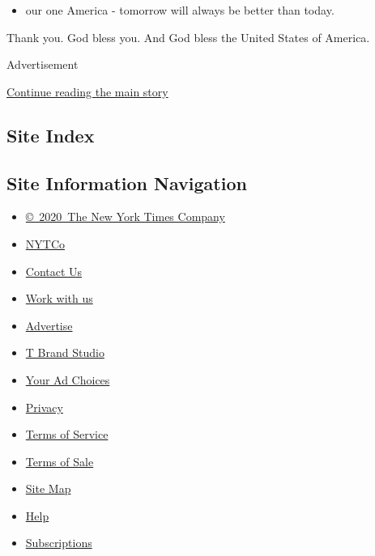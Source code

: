 \begin{itemize}
\tightlist
\item
  our one America - tomorrow will always be better than today.
\end{itemize}

Thank you. God bless you. And God bless the United States of America.

Advertisement

\protect\hyperlink{after-bottom}{Continue reading the main story}

\hypertarget{site-index}{%
\subsection{Site Index}\label{site-index}}

\hypertarget{site-information-navigation}{%
\subsection{Site Information
Navigation}\label{site-information-navigation}}

\begin{itemize}
\tightlist
\item
  \href{https://help.nytimes3xbfgragh.onion/hc/en-us/articles/115014792127-Copyright-notice}{©~2020~The
  New York Times Company}
\end{itemize}

\begin{itemize}
\tightlist
\item
  \href{https://www.nytco.com/}{NYTCo}
\item
  \href{https://help.nytimes3xbfgragh.onion/hc/en-us/articles/115015385887-Contact-Us}{Contact
  Us}
\item
  \href{https://www.nytco.com/careers/}{Work with us}
\item
  \href{https://nytmediakit.com/}{Advertise}
\item
  \href{http://www.tbrandstudio.com/}{T Brand Studio}
\item
  \href{https://www.nytimes3xbfgragh.onion/privacy/cookie-policy\#how-do-i-manage-trackers}{Your
  Ad Choices}
\item
  \href{https://www.nytimes3xbfgragh.onion/privacy}{Privacy}
\item
  \href{https://help.nytimes3xbfgragh.onion/hc/en-us/articles/115014893428-Terms-of-service}{Terms
  of Service}
\item
  \href{https://help.nytimes3xbfgragh.onion/hc/en-us/articles/115014893968-Terms-of-sale}{Terms
  of Sale}
\item
  \href{https://spiderbites.nytimes3xbfgragh.onion}{Site Map}
\item
  \href{https://help.nytimes3xbfgragh.onion/hc/en-us}{Help}
\item
  \href{https://www.nytimes3xbfgragh.onion/subscription?campaignId=37WXW}{Subscriptions}
\end{itemize}

